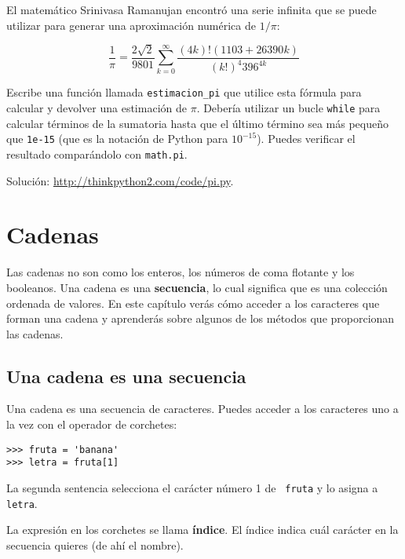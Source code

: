 \documentclass[10pt]{book}
\begin{document}
\begin{exercise}

El matemático Srinivasa Ramanujan encontró una
serie infinita
que se puede utilizar para generar una aproximación
numérica de $1 / \pi$:

\[ \frac{1}{\pi} = \frac{2\sqrt{2}}{9801}
\sum^\infty_{k=0} \frac{(4k)!(1103+26390k)}{(k!)^4 396^{4k}} \]

Escribe una función llamada \verb"estimacion_pi" que utilice esta fórmula
para calcular y devolver una estimación de $\pi$.  Debería utilizar un bucle {\tt while}
para calcular términos de la sumatoria hasta que el último término sea
más pequeño que {\tt 1e-15} (que es la notación de Python para $10^{-15}$).
Puedes verificar el resultado comparándolo con {\tt math.pi}.

Solución: \url{http://thinkpython2.com/code/pi.py}.

\end{exercise}


\chapter{Cadenas}
\label{strings}

Las cadenas no son como los enteros, los números de coma flotante y los booleanos.  Una cadena
es una {\bf secuencia}, lo cual significa que es
una colección ordenada de valores.  En este capítulo verás
cómo acceder a los caracteres que forman una cadena y
aprenderás sobre algunos de los métodos que proporcionan las cadenas.


\section{Una cadena es una secuencia}

Una cadena es una secuencia de caracteres.
Puedes acceder a los caracteres uno a la vez con el
operador de corchetes:

\begin{verbatim}
>>> fruta = 'banana'
>>> letra = fruta[1]
\end{verbatim}
%
La segunda sentencia selecciona el carácter número 1 de {\tt
fruta} y lo asigna a {\tt letra}.

La expresión en los corchetes se llama {\bf índice}.
El índice indica cuál carácter en la secuencia
quieres (de ahí el nombre).
\end{document}
